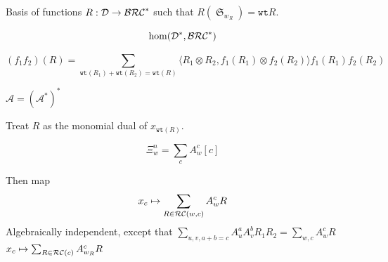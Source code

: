 \documentclass{amsart}
\newtheorem{proposition}[lemma]{Proposition}
\theoremstyle{definition}
\theoremstyle{remark}
\numberwithin{equation}{subsection}
\DeclareMathOperator{\sch}{\mathfrak{S}}
\newcommand{\wof}[1]{w_{#1}}
\newcommand{\wtt}{\mathtt{wt}}
\newcommand{\trm}{\mathtt{trim}}
\newcommand{\hr}{\mathtt{ht}}
\newcommand{\coma}{\mathcal{A}}
\newcommand{\dcoma}{\mathcal{D}}
\begin{document}
Basis of functions $R:\dcoma\to\BRC^*$ such that $R(\sch_{\wof{R}})=\wtt{R}$.

$$\hom(\dcoma^*,\BRC^*)$$



$$(f_1f_2)(R) = \sum_{\wtt(R_1)+\wtt(R_2)=\wtt(R)} \langle R_1\otimes R_2, f_1(R_1)\otimes f_2(R_2)\rangle f_1(R_1)f_2(R_2)$$


$\coma = (\coma^*)^*$

Treat $R$ as the monomial dual of $x_{\wtt(R)}$.

$$\Xi_w^n = \sum_c A_w^c[c]$$

Then map
$$x_c\mapsto \sum_{R\in \mathcal{RC}(w,c)} A_w^cR$$
Algebraically independent, except that $\sum_{u,v,a+b=c}A_u^aA_v^bR_1R_2 = \sum_{w,c}A_w^cR$
$x_c\mapsto \sum_{R\in \RC(c)}A_{\wof{R}}^{c}R$
\end{document}
